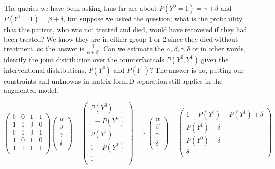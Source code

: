 \documentclass[11pt,a4paper]{article}
\begin{document}
The queries we have been asking thus far are about $P(Y^{0}=1) = \gamma + \delta$ and $P(Y^{1}=1) = \beta + \delta$, but suppose we asked the question; what is the probability that this patient, who was not treated and died, would have recovered if they had been treated? We know they are in either group 1 or 2 since they died without treatment, so the answer is $\frac{\beta}{\alpha+\beta}$. Can we estimate the $\alpha, \beta, \gamma, \delta$ or in other words, identify the joint distribution over the counterfactuals $P(Y^{0},Y^{1})$ given the interventional distributions, $P(Y^{0})$ and $P(Y^{1})$? The answer is no, putting our constraints and unknowns in matrix form:D-separation still applies in the augmented model.

\begin{equation}
\left(
\begin{array}{cccc}
0&0&1&1\\
1&1&0&0\\
0&1&0&1\\
1&0&1&0\\
1&1&1&1\\
\end{array}
\right)
\left(
\begin{array}{c}
\alpha\\
\beta\\
\gamma\\
\delta\\
\end{array}
\right)= 
\left(
\begin{array}{c}
P(Y^{0})\\
1-P(Y^{0})\\
P(Y^{1})\\
1-P(Y^{1})\\
1\\
\end{array}
\right)
\implies
\left(
\begin{array}{c}
\alpha\\
\beta\\
\gamma\\
\delta\\
\end{array}
\right)=
\left(
\begin{array}{c}
1-P(Y^{0})-P(Y^{1})+\delta\\
P(Y^{1})-\delta\\
P(Y^{0})-\delta\\
\delta\\
\end{array}
\right)
\end{equation}
\end{document}
